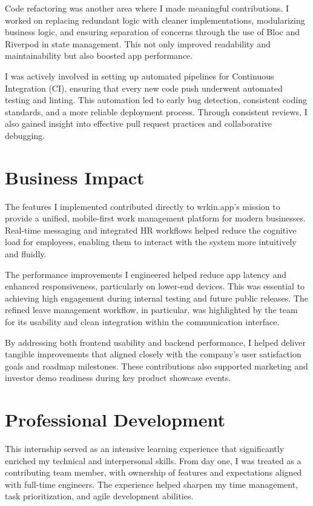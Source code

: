 Code refactoring was another area where I made meaningful contributions. I worked on replacing redundant logic with cleaner implementations, modularizing business logic, and ensuring separation of concerns through the use of Bloc and Riverpod in state management. This not only improved readability and maintainability but also boosted app performance.

I was actively involved in setting up automated pipelines for Continuous Integration (CI), ensuring that every new code push underwent automated testing and linting. This automation led to early bug detection, consistent coding standards, and a more reliable deployment process. Through consistent reviews, I also gained insight into effective pull request practices and collaborative debugging.

\section{Business Impact}

The features I implemented contributed directly to wrkin.app’s mission to provide a unified, mobile-first work management platform for modern businesses. Real-time messaging and integrated HR workflows helped reduce the cognitive load for employees, enabling them to interact with the system more intuitively and fluidly.

The performance improvements I engineered helped reduce app latency and enhanced responsiveness, particularly on lower-end devices. This was essential to achieving high engagement during internal testing and future public releases. The refined leave management workflow, in particular, was highlighted by the team for its usability and clean integration within the communication interface.

By addressing both frontend usability and backend performance, I helped deliver tangible improvements that aligned closely with the company’s user satisfaction goals and roadmap milestones. These contributions also supported marketing and investor demo readiness during key product showcase events.

\section{Professional Development}

This internship served as an intensive learning experience that significantly enriched my technical and interpersonal skills. From day one, I was treated as a contributing team member, with ownership of features and expectations aligned with full-time engineers. The experience helped sharpen my time management, task prioritization, and agile development abilities.

